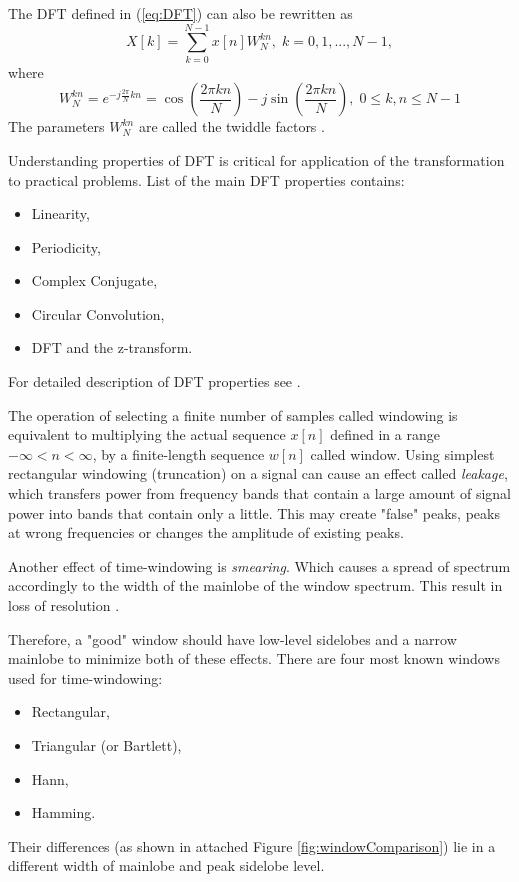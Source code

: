 \documentclass[twoside]{ctuthesis}
\theoremstyle{plain}
\theoremstyle{definition}
\theoremstyle{note}
\begin{document}
The DFT defined in (\ref{eq:DFT}) can also be rewritten as
\begin{equation} \label{eq:DFT2}
	X[k]=\sum_{k=0}^{N-1}x[n]W^{kn}_{N},\; k = 0, 1, ..., N-1,
\end{equation}
where
\begin{equation} \label{eq:Twiddle}
	W^{kn}_{N}=e^{-j \frac{2 \pi}{N} kn}=\cos(\frac{2\pi kn}{N})-j\sin(\frac{2\pi kn}{N}), \;0\leq k,n\leq N-1
\end{equation}
The parameters $W^{kn}_{N}$ are called the twiddle factors \cite{cite:RT_DSP}.
\par
Understanding properties of DFT is critical for application of the transformation to practical problems. List of the main DFT properties contains:
\begin{itemize}
	\setlength{\itemsep}{5pt}
	\item Linearity,
	
	\item Periodicity,
	
	\item Complex Conjugate,
	
	\item Circular Convolution,
	
	\item DFT and the z-transform.
\end{itemize}
For detailed description of DFT properties see \cite{cite:2,cite:RT_DSP}.

The operation of selecting a finite number of samples called windowing is equivalent to multiplying the actual sequence $x[n]$ defined in a range $-\infty < n < \infty$, by a finite-length sequence $w[n]$ called window. Using simplest rectangular windowing (truncation) on a signal can cause an effect called \textit{leakage}, which transfers power from frequency bands that contain a large amount of signal power into bands that contain only a little. This may create "false" peaks, peaks at wrong frequencies or changes the amplitude of existing peaks. 

Another effect of time-windowing is \textit{smearing}. Which causes a spread of spectrum accordingly to the width of the mainlobe of the window spectrum. This result in loss of resolution \cite{cite:3} .

Therefore, a "good" window should have low-level sidelobes and a narrow mainlobe to minimize both of these effects. There are four most known windows used for time-windowing: 
\begin{itemize}
	\setlength{\itemsep}{5pt}
	\item Rectangular,
	
	\item Triangular (or Bartlett),
	
	\item Hann,
	
	\item Hamming.
\end{itemize}    
Their differences (as shown in attached Figure \ref{fig:windowComparison}) lie in a different width of mainlobe and peak sidelobe level.
\end{document}
